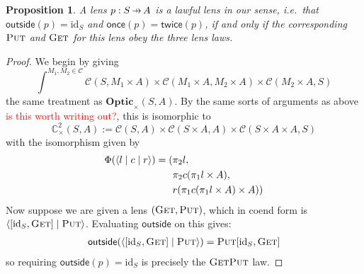 \documentclass[11pt,a4paper]{article}
\theoremstyle{plain}
\newtheorem{proposition}[theorem]{Proposition}
\theoremstyle{definition}
\newcommand{\C}{\mathscr{C}}
\newcommand{\Optic}{\mathbf{Optic}}
\newcommand{\conctwice}{\mathbb{C}^2}
\newcommand{\id}{\mathrm{id}}
\newcommand{\rep}[2]{{\ensuremath \left\langle #1 \mid #2 \right\rangle}}
\newcommand{\repthree}[3]{{\ensuremath \langle #1 \mid #2 \mid #3 \rangle}}
\newcommand{\fget}{\textsc{Get}}
\newcommand{\fput}{\textsc{Put}}
\newcommand{\outside}{\mathsf{outside}}
\newcommand{\once}{\mathsf{once}}
\newcommand{\twice}{\mathsf{twice}}
\newcommand{\hto}{\ensuremath{\,\mathaccent\shortmid\rightarrow\,}}
\newcommand{\todo}[1]{\textcolor{red}{\small #1}}
\begin{document}
\begin{proposition}\label{prop-OpticImpliesLensLaws}
  A lens $p : S \hto A$ is a lawful lens in our sense, i.e.\ that $\outside(p) = \id_S$ and $\once(p) = \twice(p)$, if and only if the corresponding $\fput$ and $\fget$ for this lens obey the three lens laws.
\end{proposition}
\begin{proof}
  We begin by giving
  \[ \int^{M_1, M_2 \in \C} \C(S, M_1 \times A) \times \C(M_1 \times A, M_2 \times A) \times \C(M_2 \times A, S)\]
  the same treatment as $\Optic_\times(S, A)$. By the same sorts of arguments as above \todo{is this worth writing out?}, this is isomorphic to
  \[\conctwice_\times(S, A) := \C(S, A) \times \C(S \times A, A) \times \C(S \times A \times A, S)\]
  with the isomorphism given by
  \begin{align*}
    \Phi(\repthree{l}{c}{r }) = (&\pi_2 l, \\
                                   &\pi_2 c (\pi_1 l \times A), \\
                                   &r(\pi_1 c (\pi_1 l \times A) \times A))
  \end{align*}
  Now suppose we are given a lens $(\fget, \fput)$, which in coend form is $\rep{[\id_S, \fget]}{\fput}$. Evaluating $\outside$ on this gives:
  \begin{align*}
    \outside(\rep{[\id_S, \fget]}{\fput}) = \fput [\id_S, \fget]
  \end{align*}
  so requiring $\outside(p) = \id_S$ is precisely the $\fget\fput$ law.


\end{proof}
\end{document}
